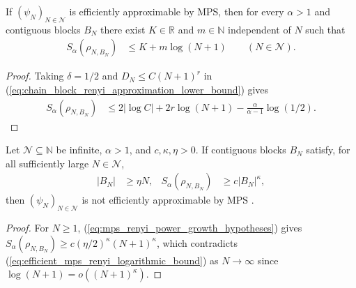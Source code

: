 \begin{theorem}
    \label{thm:efficient_mps_renyi_logarithmic_bound}
    \leanok
    If $(\psi_N)_{N\in\mathcal N}$ is efficiently approximable by MPS, then for
    every $\alpha>1$ and contiguous blocks $B_N$ there exist $K\in\mathbb R$ and
    $m\in\mathbb N$ independent of $N$ such that
    \begin{align}
        \label{eq:efficient_mps_renyi_logarithmic_bound}
        S_\alpha(\rho_{N,B_N}) & \le K+m\log(N+1)
        \qquad(N\in\mathcal N).
    \end{align}
\end{theorem}
\begin{proof}\leanok
    Taking $\delta=1/2$ and $D_N\le C(N+1)^r$ in
    (\ref{eq:chain_block_renyi_approximation_lower_bound}) gives
    \begin{align}
        \label{eq:efficient_mps_renyi_fixed_accuracy}
        S_\alpha(\rho_{N,B_N})
         & \le2|\log C|+2r\log(N+1)
        -\frac{\alpha}{\alpha-1}\log(1/2).
    \end{align}
\end{proof}

\begin{lemma}
    \label{thm:mps_renyi_power_growth_obstruction}
    \leanok
    Let $\mathcal N\subseteq\mathbb N$ be infinite, $\alpha>1$, and
    $c,\kappa,\eta>0$. If contiguous blocks $B_N$ satisfy, for all sufficiently
    large $N\in\mathcal N$,
    \begin{align}
        \label{eq:mps_renyi_power_growth_hypotheses}
        |B_N| & \ge\eta N,
              & S_\alpha(\rho_{N,B_N}) & \ge c|B_N|^\kappa,
    \end{align}
    then $(\psi_N)_{N\in\mathcal N}$ is not efficiently approximable by MPS
    \cite[lines 309--315]{Schuch2008EntropyScaling}.
\end{lemma}
\begin{proof}\leanok
    For $N\ge1$, (\ref{eq:mps_renyi_power_growth_hypotheses}) gives
    $S_\alpha(\rho_{N,B_N})\ge c(\eta/2)^\kappa(N+1)^\kappa$, which contradicts
    (\ref{eq:efficient_mps_renyi_logarithmic_bound}) as $N\to\infty$ since
    $\log(N+1)=o((N+1)^\kappa)$.
\end{proof}

